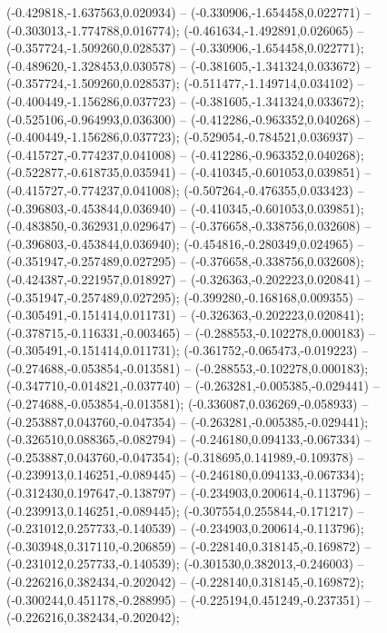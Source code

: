  (-0.429818,-1.637563,0.020934) -- (-0.330906,-1.654458,0.022771) -- (-0.303013,-1.774788,0.016774);
 (-0.461634,-1.492891,0.026065) -- (-0.357724,-1.509260,0.028537) -- (-0.330906,-1.654458,0.022771);
 (-0.489620,-1.328453,0.030578) -- (-0.381605,-1.341324,0.033672) -- (-0.357724,-1.509260,0.028537);
 (-0.511477,-1.149714,0.034102) -- (-0.400449,-1.156286,0.037723) -- (-0.381605,-1.341324,0.033672);
 (-0.525106,-0.964993,0.036300) -- (-0.412286,-0.963352,0.040268) -- (-0.400449,-1.156286,0.037723);
 (-0.529054,-0.784521,0.036937) -- (-0.415727,-0.774237,0.041008) -- (-0.412286,-0.963352,0.040268);
 (-0.522877,-0.618735,0.035941) -- (-0.410345,-0.601053,0.039851) -- (-0.415727,-0.774237,0.041008);
 (-0.507264,-0.476355,0.033423) -- (-0.396803,-0.453844,0.036940) -- (-0.410345,-0.601053,0.039851);
 (-0.483850,-0.362931,0.029647) -- (-0.376658,-0.338756,0.032608) -- (-0.396803,-0.453844,0.036940);
 (-0.454816,-0.280349,0.024965) -- (-0.351947,-0.257489,0.027295) -- (-0.376658,-0.338756,0.032608);
 (-0.424387,-0.221957,0.018927) -- (-0.326363,-0.202223,0.020841) -- (-0.351947,-0.257489,0.027295);
 (-0.399280,-0.168168,0.009355) -- (-0.305491,-0.151414,0.011731) -- (-0.326363,-0.202223,0.020841);
 (-0.378715,-0.116331,-0.003465) -- (-0.288553,-0.102278,0.000183) -- (-0.305491,-0.151414,0.011731);
 (-0.361752,-0.065473,-0.019223) -- (-0.274688,-0.053854,-0.013581) -- (-0.288553,-0.102278,0.000183);
 (-0.347710,-0.014821,-0.037740) -- (-0.263281,-0.005385,-0.029441) -- (-0.274688,-0.053854,-0.013581);
 (-0.336087,0.036269,-0.058933) -- (-0.253887,0.043760,-0.047354) -- (-0.263281,-0.005385,-0.029441);
 (-0.326510,0.088365,-0.082794) -- (-0.246180,0.094133,-0.067334) -- (-0.253887,0.043760,-0.047354);
 (-0.318695,0.141989,-0.109378) -- (-0.239913,0.146251,-0.089445) -- (-0.246180,0.094133,-0.067334);
 (-0.312430,0.197647,-0.138797) -- (-0.234903,0.200614,-0.113796) -- (-0.239913,0.146251,-0.089445);
 (-0.307554,0.255844,-0.171217) -- (-0.231012,0.257733,-0.140539) -- (-0.234903,0.200614,-0.113796);
 (-0.303948,0.317110,-0.206859) -- (-0.228140,0.318145,-0.169872) -- (-0.231012,0.257733,-0.140539);
 (-0.301530,0.382013,-0.246003) -- (-0.226216,0.382434,-0.202042) -- (-0.228140,0.318145,-0.169872);
 (-0.300244,0.451178,-0.288995) -- (-0.225194,0.451249,-0.237351) -- (-0.226216,0.382434,-0.202042);
